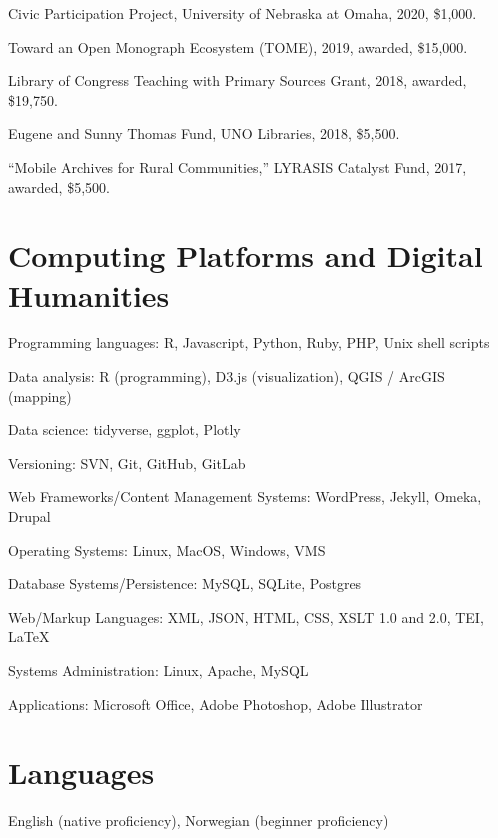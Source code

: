 Civic Participation Project, University of Nebraska at Omaha, 2020,
\$1,000.

Toward an Open Monograph Ecosystem (TOME), 2019, awarded, \$15,000.

Library of Congress Teaching with Primary Sources Grant, 2018, awarded,
\$19,750.

Eugene and Sunny Thomas Fund, UNO Libraries, 2018, \$5,500.

``Mobile Archives for Rural Communities,'' LYRASIS Catalyst Fund, 2017,
awarded, \$5,500.

\section{Computing Platforms and Digital
Humanities}\label{computing-platforms-and-digital-humanities}

Programming languages: R, Javascript, Python, Ruby, PHP, Unix shell
scripts

Data analysis: R (programming), D3.js (visualization), QGIS / ArcGIS
(mapping)

Data science: tidyverse, ggplot, Plotly

Versioning: SVN, Git, GitHub, GitLab

Web Frameworks/Content Management Systems: WordPress, Jekyll, Omeka,
Drupal

Operating Systems: Linux, MacOS, Windows, VMS

Database Systems/Persistence: MySQL, SQLite, Postgres

Web/Markup Languages: XML, JSON, HTML, CSS, XSLT 1.0 and 2.0, TEI,
\LaTeX

Systems Administration: Linux, Apache, MySQL

Applications: Microsoft Office, Adobe Photoshop, Adobe Illustrator

\section{Languages}\label{languages}

English (native proficiency), Norwegian (beginner proficiency)
